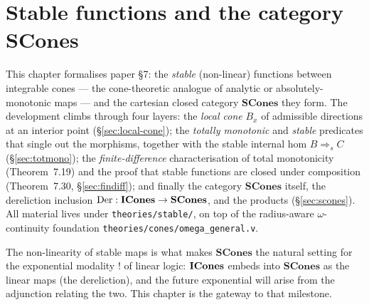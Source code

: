 %

\chapter{Stable functions and the category \texorpdfstring{$\mathbf{SCones}$}{SCones}}\label{ch:stable}

This chapter formalises paper \S7: the \emph{stable} (non-linear)
functions between integrable cones --- the cone-theoretic analogue of
analytic or absolutely-monotonic maps --- and the cartesian closed
category $\mathbf{SCones}$ they form. The development climbs through
four layers: the \emph{local cone} $B_x$ of admissible directions at an
interior point (\S\ref{sec:local-cone}); the \emph{totally monotonic}
and \emph{stable} predicates that single out the morphisms, together
with the stable internal hom $B \mathbin{\Rightarrow_s} C$
(\S\ref{sec:totmono}); the \emph{finite-difference} characterisation of
total monotonicity (Theorem~7.19) and the proof that stable functions
are closed under composition (Theorem~7.30, \S\ref{sec:findiff}); and
finally the category $\mathbf{SCones}$ itself, the dereliction inclusion
$\mathrm{Der} : \mathbf{ICones} \to \mathbf{SCones}$, and the products
(\S\ref{sec:scones}). All material lives under
\texttt{theories/stable/}, on top of the radius-aware $\omega$-continuity
foundation \texttt{theories/cones/omega\_general.v}.

The non-linearity of stable maps is what makes $\mathbf{SCones}$ the
natural setting for the exponential modality $\mathord{!}$ of linear
logic: $\mathbf{ICones}$ embeds into $\mathbf{SCones}$ as the linear maps (the
dereliction), and the future exponential will arise from the adjunction
relating the two. This chapter is the gateway to that milestone.

